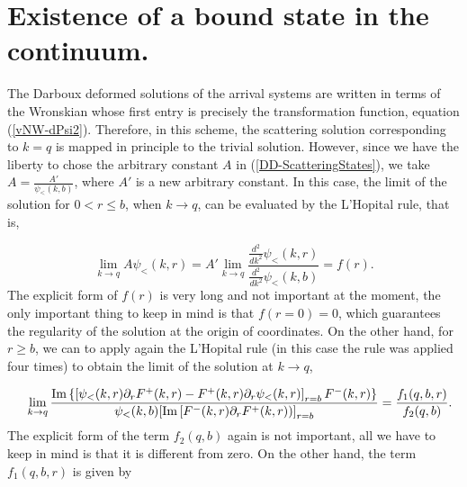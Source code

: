 \documentclass[a4paper]{jpconf}
\begin{document}
\section{Existence of a bound state in the continuum.}

The Darboux deformed solutions of the arrival systems are written in terms of the Wronskian whose first entry is precisely the transformation function, equation (\ref{vNW-dPsi2}). Therefore, in this scheme, the scattering solution corresponding to $k=q$ is mapped in principle to the trivial solution. However, since we have the liberty to chose the arbitrary constant 
$A$ in (\ref{DD-ScatteringStates}), we take $A=\frac{A'}{\psi_{<}(k,b)}$, where $A'$ is a new arbitrary constant. In this case, the limit of the solution for $0<r\leq b$, when $k\rightarrow q$, can be evaluated by the L'Hopital rule, that is,   


\begin{equation}
	\lim_{k\rightarrow q}A \psi_{<}(k,r) = A'  \lim_{k\rightarrow q}\frac{\frac{d^2}{dk^2}\psi_{<}(k,r)}{\frac{d^2}{dk^2}\psi_{<}(k,b)}=f(r).
\end{equation}
The explicit form of $f(r)$ is very long and not important at the moment, the only important thing to keep in mind is that $f(r=0)=0$, which guarantees the regularity of the solution at the origin of coordinates. On the other hand, for $r\geq b$, we can to apply again the L'Hopital rule (in this case the rule was applied four times) to obtain the limit of the solution at $k\rightarrow q$, 

\begin{eqnarray*}
&&\lim_{k\to q}\frac{{\rm Im}\left\{\left[\psi_{<}(k,r)\partial_{r}F^{+}(k,r)-F^{+}(k,r)\partial_{r}\psi_{<}(k,r)\right]_{r=b}F^{-}(k,r)\right\}}{\psi_{<}(k,b)[{\rm Im}\left[F^{-}(k,r)\partial_{r}F^{+}(k,r))\right]_{r=b}}  = \frac{f_1(q,b,r)}{f_2(q,b)}.
\end{eqnarray*}
The explicit form of the term $f_2(q,b)$ again is not important,  all we have to keep in mind is that it is different from zero. On the other hand, the term $f_1(q,b,r)$ is given by
\end{document}
